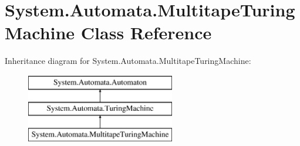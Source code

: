 \hypertarget{class_system_1_1_automata_1_1_multitape_turing_machine}{}\section{System.\+Automata.\+Multitape\+Turing\+Machine Class Reference}
\label{class_system_1_1_automata_1_1_multitape_turing_machine}
Inheritance diagram for System.\+Automata.\+Multitape\+Turing\+Machine\+:\begin{figure}[H]
\begin{center}
\leavevmode
\includegraphics[height=3.000000cm]{class_system_1_1_automata_1_1_multitape_turing_machine}
\end{center}
\end{figure}
